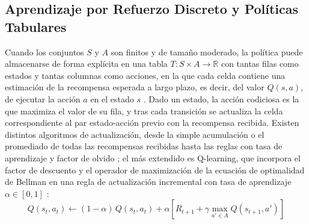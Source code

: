 \subsection{Aprendizaje por Refuerzo Discreto y Políticas Tabulares}\label{sec:rl-discreto}
Cuando los conjuntos $S$ y $A$ son finitos y de tamaño moderado, la política puede almacenarse de forma explícita en una tabla $T: S \times A \rightarrow \mathbb{R}$ con tantas filas como estados y tantas columnas como acciones, en la que cada celda contiene una estimación de la recompensa esperada a largo plazo, es decir, del valor $Q(s, a)$, de ejecutar la acción $a$ en el estado $s$ \citep{sierragarcia2020exploring, sierragarcia2024federated}. Dado un estado, la acción codiciosa es la que maximiza el valor de su fila, y tras cada transición se actualiza la celda correspondiente al par estado-acción previo con la recompensa recibida. Existen distintos algoritmos de actualización, desde la simple acumulación o el promediado de todas las recompensas recibidas hasta las reglas con tasa de aprendizaje y factor de olvido \citep{sierragarcia2020exploring}; el más extendido es Q-learning, que incorpora el factor de descuento y el operador de maximización de la ecuación de optimalidad de Bellman en una regla de actualización incremental con tasa de aprendizaje $\alpha \in [0, 1]$ \citep{shakya2023reinforcement, sierragarcia2020exploring}:
\begin{equation}
    Q(s_t, a_t) \leftarrow (1 - \alpha)\, Q(s_t, a_t) + \alpha \left[ R_{t+1} + \gamma \max_{a' \in A} Q(s_{t+1}, a') \right]
\end{equation}

